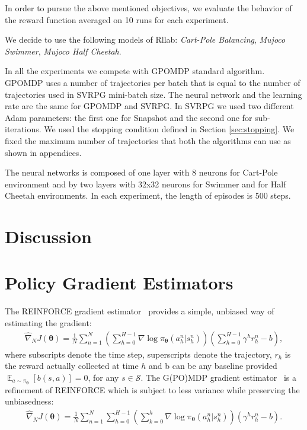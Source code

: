 \documentclass{article}
\theoremstyle{remark}
\theoremstyle{definition}
\DeclareMathOperator*{\EV}{\mathbb{E}}
\newcommand{\EVV}[2][\ppvect \in \ppspace]{\EV_{#1}\left[{#2}\right]}
\newcommand{\vtheta}{\boldsymbol{\theta}}
\newcommand{\Sspace}{\mathcal{S}}
\newcommand{\pol}{\pi_{\vtheta}}
\newcommand{\score}[2]{\nabla\log\pi_{#1}(#2)}
\newcommand{\gradApp}[2]{\widehat{\nabla}_{#2}J(#1)}
\begin{document}
In order to pursue the above mentioned objectives, we evaluate the behavior of the reward function averaged on 10 runs for each experiment.

We decide to use the following models of Rllab: \emph{Cart-Pole Balancing}, \emph{Mujoco Swimmer}, \emph{Mujoco Half Cheetah}.


In all the experiments we compete with GPOMDP standard algorithm. GPOMDP uses a number of trajectories per batch that is equal to the number of trajectories used in SVRPG mini-batch size.
The neural network and the learning rate are the same for GPOMDP and SVRPG.
In SVRPG we used two different Adam parameters: the first one for Snapshot and the second one for sub-iterations.
We used the stopping condition defined in Section \ref{sec:stopping}.
We fixed the maximum number of trajectories that both the algorithms can use as shown in appendices. 

The neural networks is composed of one layer with 8 neurons for Cart-Pole environment and by two layers with 32x32 neurons for Swimmer and for Half Cheetah environments. In each experiment, the length of episodes is 500 steps.

\section{Discussion}




\newpage
\mbox{}
\newpage
\onecolumn
\appendix

\section{Policy Gradient Estimators} \label{A:gradient_estimators}


The REINFORCE gradient estimator~\citep{williams1992simple} provides a simple, unbiased way of estimating the gradient:
\begin{align*}
\gradApp{\vtheta}{N} = \frac{1}{N}\sum_{n=1}^{N}\left(\sum_{h=0}^{H-1}\score{\vtheta}{a_h^n\vert s_h^n}\right)\left(\sum_{h=0}^{H-1}\gamma^h r_h^n - b\right),
\end{align*}
where subscripts denote the time step, superscripts denote the trajectory, $r_h$ is the reward actually collected at time $h$ and b can be any baseline provided $\EVV[a \sim \pol]{b(s,a)} = 0$, for any $s\in\Sspace$.
The G(PO)MDP gradient estimator~\cite{baxter2001infinite} is a refinement of REINFORCE which is subject to less variance \cite{zhao2011analysis} while preserving the unbiasedness:
\begin{align*}
\gradApp{\vtheta}{N} = \frac{1}{N}\sum_{n=1}^{N}\sum_{h=0}^{H-1}\left(\sum_{k=0}^{h}\score{\vtheta}{a_h^n\vert s_h^n}\right)\left(\gamma^h r_h^n - b\right).
\end{align*}
\end{document}
